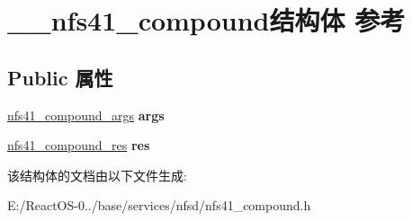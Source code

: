 \hypertarget{struct____nfs41__compound}{}\section{\+\_\+\+\_\+nfs41\+\_\+compound结构体 参考}
\label{struct____nfs41__compound}
\subsection*{Public 属性}
\begin{DoxyCompactItemize}
\item 
\mbox{\label{struct____nfs41__compound_a46834ec427a67abb7b68b6c86fe3a144}} 
\hyperlink{struct____nfs41__compound__args}{nfs41\+\_\+compound\+\_\+args} {\bfseries args}
\item 
\mbox{\label{struct____nfs41__compound_a151f11af354f62b122f1a7317bafcf25}} 
\hyperlink{struct____nfs41__compound__res}{nfs41\+\_\+compound\+\_\+res} {\bfseries res}
\end{DoxyCompactItemize}


该结构体的文档由以下文件生成\+:\begin{DoxyCompactItemize}
\item 
E\+:/\+React\+O\+S-\/0../base/services/nfsd/nfs41\+\_\+compound.\+h\end{DoxyCompactItemize}
